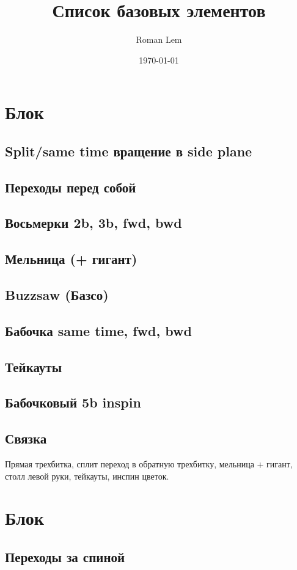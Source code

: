 \documentclass[a4paper, 12pt]{article}
\title{Список базовых элементов}
\author{Roman Lem}
\date{\today}
\begin{document}
	\maketitle
	\newpage
	\section{Блок}
	
	\subsection{Split/same time вращение в side plane}
	\subsection{Переходы перед собой}
	\subsection{Восьмерки 2b, 3b, fwd, bwd}
	\subsection{Мельница (+ гигант)}
	\subsection{Buzzsaw (Базсо)}
	\subsection{Бабочка same time, fwd, bwd}
	\subsection{Тейкауты}
	\subsection{Бабочковый 5b inspin}
	\subsection{Связка}
	
	Прямая трехбитка, сплит переход в обратную трехбитку, мельница + гигант, столл левой руки, тейкауты, инспин цветок.
	
	\section{Блок}
	
	\subsection{Переходы за спиной}
\end{document}
